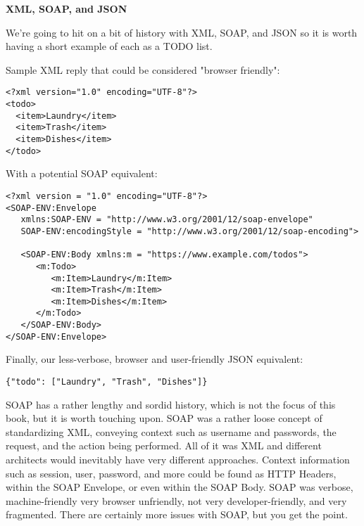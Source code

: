 \begin{sidebar}
\begin{center}
\textbf{XML, SOAP, and JSON}
\end{center}
We're going to hit on a bit of history with XML, SOAP, and JSON so it is worth having a short example of each as a TODO list.

Sample XML reply that could be considered "browser friendly":

\begin{code}
\vspace{-\baselineskip}
\begin{lstlisting}[belowskip=-\baselineskip]
<?xml version="1.0" encoding="UTF-8"?>
<todo>
  <item>Laundry</item>
  <item>Trash</item>
  <item>Dishes</item>
</todo>

\end{lstlisting}
\end{code}

With a potential SOAP equivalent:

\begin{code}
\vspace{-\baselineskip}
\begin{lstlisting}[belowskip=-\baselineskip]
<?xml version = "1.0" encoding="UTF-8"?>
<SOAP-ENV:Envelope
   xmlns:SOAP-ENV = "http://www.w3.org/2001/12/soap-envelope"
   SOAP-ENV:encodingStyle = "http://www.w3.org/2001/12/soap-encoding">

   <SOAP-ENV:Body xmlns:m = "https://www.example.com/todos">
      <m:Todo>
         <m:Item>Laundry</m:Item>
         <m:Item>Trash</m:Item>
         <m:Item>Dishes</m:Item>
      </m:Todo>
   </SOAP-ENV:Body>
</SOAP-ENV:Envelope>

\end{lstlisting}
\end{code}

Finally, our less-verbose, browser and user-friendly JSON equivalent:

\begin{code}
\vspace{-\baselineskip}
\begin{lstlisting}[belowskip=-\baselineskip]
{"todo": ["Laundry", "Trash", "Dishes"]}
\end{lstlisting}
\end{code}

\end{sidebar}

SOAP has a rather lengthy and sordid history, which is not the focus of this book, but it is worth touching upon.  SOAP was a rather loose concept of standardizing XML, conveying context such as username and passwords, the request, and the action being performed.  All of it was XML and different architects would inevitably have very different approaches.  Context information such as session, user, password, and more could be found as HTTP Headers, within the SOAP Envelope, or even within the SOAP Body.  SOAP was verbose, machine-friendly very browser unfriendly, not very developer-friendly, and very fragmented.  There are certainly more issues with SOAP, but you get the point.

